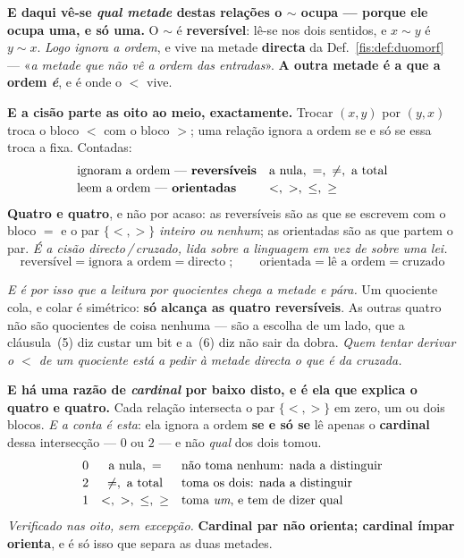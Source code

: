 \documentclass[livro.tex]{subfiles}
\begin{document}
\medskip\noindent\textbf{E daqui vê-se \emph{qual metade} destas relações o $\sim$
ocupa --- porque ele ocupa uma, e só uma.} O $\sim$ é \textbf{reversível}: lê-se
nos dois sentidos, e $x\sim y$ é $y\sim x$. \emph{Logo ignora a ordem}, e vive na
metade \textbf{directa} da Def.~\ref{fis:def:duomorf} --- «\emph{a metade que não
vê a ordem das entradas}». \textbf{A outra metade é a que a ordem \emph{é}}, e é
onde o $<$ vive.

\medskip\noindent\textbf{E a cisão parte as oito ao meio, exactamente.} Trocar
$(x,y)$ por $(y,x)$ troca o bloco $<$ com o bloco $>$; uma relação ignora a ordem
se e só se essa troca a fixa. Contadas:
\[
\begin{array}{ll}
\text{ignoram a ordem --- \textbf{reversíveis}} & \text{a nula},\ =,\ \neq,\ \text{a total}\\[2pt]
\text{leem a ordem --- \textbf{orientadas}} & <,\ >,\ \le,\ \ge
\end{array}
\]
\textbf{Quatro e quatro}, e não por acaso: as reversíveis são as que se escrevem
com o bloco $=$ e o par $\{<,>\}$ \emph{inteiro ou nenhum}; as orientadas são as
que partem o par. \emph{É a cisão directo\,/\,cruzado, lida sobre a linguagem em
vez de sobre uma lei.}
\[
\boxed{\;\text{reversível}=\text{ignora a ordem}=\text{directo}\;;\qquad \text{orientada}=\text{lê a ordem}=\text{cruzado}\;}
\]

\medskip\noindent\emph{E é por isso que a leitura por quocientes chega a metade e
pára.} Um quociente cola, e colar é simétrico: \textbf{só alcança as quatro
reversíveis}. As outras quatro não são quocientes de coisa nenhuma --- são a
escolha de um lado, que a cláusula~(5) diz custar um bit e a~(6) diz não sair da
dobra. \emph{Quem tentar derivar o $<$ de um quociente está a pedir à metade
directa o que é da cruzada.}

\medskip\noindent\textbf{E há uma razão de \emph{cardinal} por baixo disto, e é
ela que explica o quatro e quatro.} Cada relação intersecta o par $\{<,>\}$ em
zero, um ou dois blocos. \emph{E a conta é esta}: ela ignora a ordem \textbf{se e
só se} lê apenas o \textbf{cardinal} dessa intersecção --- $0$ ou $2$ --- e não
\emph{qual} dos dois tomou.
\[
\begin{array}{ccl}
0 & \text{a nula},\ = & \text{não toma nenhum: nada a distinguir}\\[2pt]
2 & \neq,\ \text{a total} & \text{toma os dois: nada a distinguir}\\[2pt]
1 & <,\ >,\ \le,\ \ge & \text{toma \emph{um}, e tem de dizer qual}
\end{array}
\]
\emph{Verificado nas oito, sem excepção.} \textbf{Cardinal par não orienta;
cardinal ímpar orienta}, e é só isso que separa as duas metades.
\end{document}
